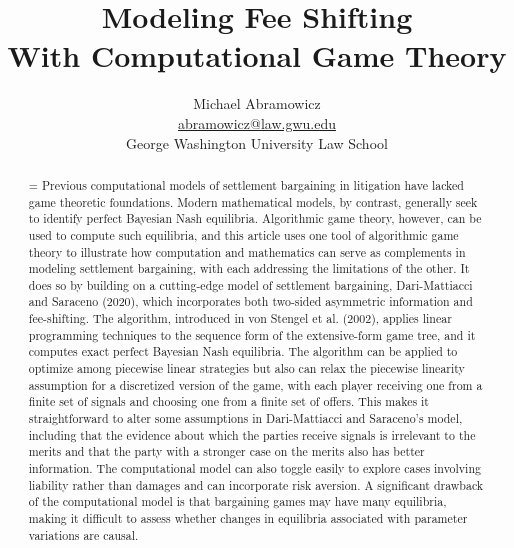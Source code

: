 \documentclass{article}
\newenvironment{nohyphen}
  {\tolerance=1%
   \emergencystretch=\maxdimen%
   \hyphenpenalty=10000%
   \hbadness=10000}%
  {\par}%
\begin{document}
\title{Modeling Fee Shifting \\ With Computational Game Theory}
\author{Michael Abramowicz \\ \href{mailto:abramowicz@law.gwu.edu}{abramowicz@law.gwu.edu} \\ George Washington University Law School}

\maketitle

\begin{abstract}
\begin{nohyphen}
Previous computational models of settlement bargaining in litigation have lacked game theoretic foundations. Modern mathematical models, by contrast, generally seek to identify perfect Bayesian Nash equilibria. Algorithmic game theory, however, can be used to compute such equilibria, and this article uses one tool of algorithmic game theory to illustrate how computation and mathematics can serve as complements in modeling settlement bargaining, with each addressing the limitations of the other. It does so by building on a cutting-edge model of settlement bargaining, Dari-Mattiacci and Saraceno (2020), which incorporates both two-sided asymmetric information and fee-shifting. The algorithm, introduced in von Stengel et al. (2002), applies linear programming techniques to the sequence form of the extensive-form game tree, and it computes exact perfect Bayesian Nash equilibria. The algorithm can be applied to optimize among piecewise linear strategies but also can relax the piecewise linearity assumption for a discretized version of the game, with each player receiving one from a finite set of signals and choosing one from a finite set of offers.  This makes it straightforward to alter some assumptions in Dari-Mattiacci and Saraceno's model, including that the evidence about which the parties receive signals is irrelevant to the merits and that the party with a stronger case on the merits also has better information. The computational model can also toggle easily to explore cases involving liability rather than damages and can incorporate risk aversion. A significant drawback of the computational model is that bargaining games may have many equilibria, making it difficult to assess whether changes in equilibria associated with parameter variations are causal.
\end{nohyphen}
\end{abstract}
\end{document}
